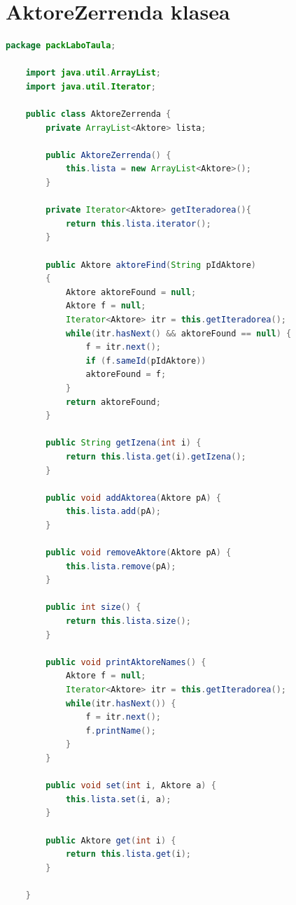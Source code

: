 \documentclass[a4paper,10pt]{report}
\begin{document}
\section{AktoreZerrenda klasea}
\begin{lstlisting}[language=java]
	package packLaboTaula;
	
	import java.util.ArrayList;
	import java.util.Iterator;
	
	public class AktoreZerrenda {
		private ArrayList<Aktore> lista;
		
		public AktoreZerrenda() {
			this.lista = new ArrayList<Aktore>(); 
		}
		
		private Iterator<Aktore> getIteradorea(){
			return this.lista.iterator();
		}
		
		public Aktore aktoreFind(String pIdAktore)
		{
			Aktore aktoreFound = null;
			Aktore f = null;
			Iterator<Aktore> itr = this.getIteradorea();
			while(itr.hasNext() && aktoreFound == null) {
				f = itr.next();
				if (f.sameId(pIdAktore))
				aktoreFound = f;
			}
			return aktoreFound;
		}
		
		public String getIzena(int i) {
			return this.lista.get(i).getIzena();
		}
		
		public void addAktorea(Aktore pA) {
			this.lista.add(pA);
		}
		
		public void removeAktore(Aktore pA) {
			this.lista.remove(pA);
		}
		
		public int size() {
			return this.lista.size();
		}
		
		public void printAktoreNames() {
			Aktore f = null;
			Iterator<Aktore> itr = this.getIteradorea();
			while(itr.hasNext()) {
				f = itr.next();
				f.printName();
			}
		}
		
		public void set(int i, Aktore a) {
			this.lista.set(i, a);
		}
		
		public Aktore get(int i) {
			return this.lista.get(i);
		}
		
	}
\end{lstlisting}
\end{document}
